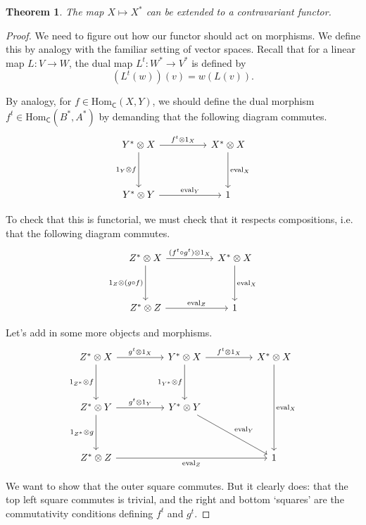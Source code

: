 \documentclass[a4paper]{report}
\newcommand{\Hom}{\mathrm{Hom}}
\newcommand{\ev}{\mathrm{eval}}
\theoremstyle{definition}
\theoremstyle{plain}
\newtheorem{theorem}{Theorem}[section]
\theoremstyle{remark}
\begin{document}
\begin{theorem}
  The map $X \mapsto X^{*}$ can be extended to a contravariant functor.
\end{theorem}
\begin{proof}
  We need to figure out how our functor should act on morphisms. We define this by analogy with the familiar setting of vector spaces. Recall that for a linear map $L\colon V \to W$, the dual map $L^{t}\colon W^{*} \to V^{*}$ is defined by
  \begin{equation*}
    (L^{t}(w))(v) = w(L(v)).
  \end{equation*}

  By analogy, for $f \in \Hom_{\mathsf{C}}(X, Y)$, we should define the dual morphism $f^{t} \in \Hom_{\mathsf{C}}(B^{*}, A^{*})$ by demanding that the following diagram commutes.
  \begin{equation*}
    \begin{tikzcd}[row sep=huge, column sep=huge]
      Y^{*} \otimes X
      \arrow[r, "f^{t} \otimes 1_{X}"]
      \arrow[d, swap, "1_{Y} \otimes f"]
      & X^{*} \otimes X
      \arrow[d, "\ev_{X}"]
      \\
      Y^{*} \otimes Y
      \arrow[r, "\ev_{Y}"]
      & 1
    \end{tikzcd}
  \end{equation*}

  To check that this is functorial, we must check that it respects compositions, i.e. that the following diagram commutes.
  \begin{equation*}
    \begin{tikzcd}[row sep=huge, column sep=huge]
      Z^{*} \otimes X
      \arrow[r, "(f^{t} \circ g^{t}) \otimes 1_{X}"]
      \arrow[d, swap, "1_{Z} \otimes (g \circ f)"]
      & X^{*} \otimes X
      \arrow[d, "\ev_{X}"]
      \\
      Z^{*} \otimes Z
      \arrow[r, "\ev_{Z}"]
      & 1
    \end{tikzcd}
  \end{equation*}

  Let's add in some more objects and morphisms.
  \begin{equation*}
    \begin{tikzcd}[row sep=huge, column sep=huge]
      Z^{*} \otimes X
      \arrow[r, "g^{t} \otimes 1_{X}"]
      \arrow[d, swap, "1_{Z^{*}} \otimes f"]
      & Y^{*} \otimes X
      \arrow[r, "f^{t} \otimes 1_{X}"]
      \arrow[d, swap, "1_{Y^{*}} \otimes f"]
      & X^{*} \otimes X
      \arrow[dd, "\ev_{X}"]
      \\
      Z^{*} \otimes Y
      \arrow[r, "g^{t} \otimes 1_{Y}"]
      \arrow[d, swap, "1_{Z^{*}} \otimes g"]
      & Y^{*} \otimes Y
      \arrow[dr, "\ev_{Y}"]
      \\
      Z^{*} \otimes Z
      \arrow[rr, swap, "\ev_{Z}"]
      & & 1
    \end{tikzcd}
  \end{equation*}

  We want to show that the outer square commutes. But it clearly does: that the top left square commutes is trivial, and the right and bottom `squares' are the commutativity conditions defining $f^{t}$ and $g^{t}$.
\end{proof}
\end{document}
